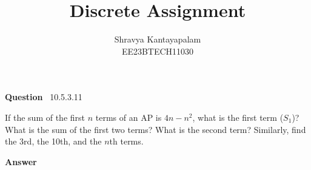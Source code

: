 \documentclass[journal,12pt,onecolumn]{IEEEtran}
\theoremstyle{remark}
\begin{document}
\let\vec\mathbf







\bigskip

\renewcommand{\thefigure}{\theenumi}
\renewcommand{\thetable}{\theenumi}


\title{Discrete Assignment}
\author{Shravya Kantayapalam\\ EE23BTECH11030}
\maketitle
\textbf{Question} \ 10.5.3.11\

 If the sum of the first \( n \) terms of an AP is \( 4n - n^2 \), what is the first term (\( S_1 \))? What is the sum of the first two terms? What is the second term? Similarly, find the 3rd, the 10th, and the \( n \)th terms.
 
\textbf{Answer}
\end{document}
